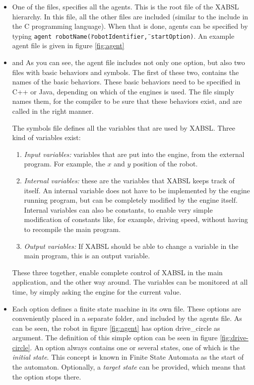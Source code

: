\documentclass[a4paper,10pt]{article}
\begin{document}
\begin{itemize}
    \item {} One of the files, specifies all the agents. This is the
    root file of the XABSL hierarchy. In this file, all the other files are
    included (similar to the include in the C programming language). When that
    is done, agents can be specified by typing \texttt{agent
    robotName(\"robotIdentifier\",
    startOption)}. An example agent file is given in figure \ref{fig:agent}
    \item {} and  As you can see, the
    agent file includes not only one option, but also two files with basic
    behaviors and symbols. The first of these two, contains the names of the
    basic behaviors. These basic behaviors need to be specified in C++ or Java,
    depending on which of the engines is used. The file simply names them, for
    the compiler to be sure that these behaviors exist, and are called in the
    right manner. 

    The symbols file defines all the variables that are used by XABSL. Three
    kind of variables exist:
    \begin{enumerate}
        \item \emph{Input variables:} variables that are put into the engine,
        from the external program. For example, the $x$ and $y$ position of the
        robot.
        \item \emph{Internal variables:} these are the variables that XABSL
        keeps track of itself. An internal variable does not have to be
        implemented by the engine running program, but can be completely
        modified by the engine itself. Internal variables can also be constants,
        to enable very simple modification of constants like, for example,
        driving speed, without having to recompile the main program.
        \item \emph{Output variables:} If XABSL should be able to change a
        variable in the main program, this is an output variable.
    \end{enumerate}
    These three together, enable complete control of XABSL in the main
    application, and the other way around. The variables can be monitored at all
    time, by simply asking the engine for the current value.
    \item {} Each option defines a finite state
    machine in its own file. These options are conveniently placed in a separate
    folder, and included by the agents file. As can be seen, the robot in figure
    \ref{fig:agent} has option drive\_circle as argument. The definition of this
    simple option can be seen in figure \ref{fig:drive-circle}. An option always
    contains one or several states, one of which is the \textit{initial state}.
    This concept is known in Finite State Automata as the start of the
    automaton. Optionally, a \textit{target state} can be provided, which means
    that the option stops there. 


\end{itemize}
\end{document}
